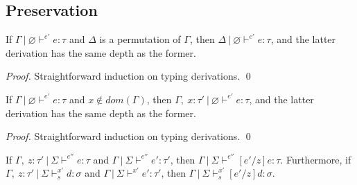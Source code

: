 \documentclass{llncs}
\begin{document}
\subsection{Preservation}

\begin{lemma}[Permutation]
If $\Gamma~|~\varnothing \vdash^{e'} e : \tau$ and $\Delta$ is a permutation of $\Gamma$, then $\Delta~|~\varnothing \vdash^{e'} e : \tau$, and the latter derivation has the same depth as the former.
\end{lemma}

\begin{proof}
Straightforward induction on typing derivations. \qed
\end{proof}

\vspace{6pt}

\begin{lemma}[Weakening]
If $\Gamma~|~\varnothing \vdash^{e'} e : \tau$ and $x \not\in dom(\Gamma)$, then $\Gamma,~x : \tau'~|~\varnothing \vdash^{e'} e : \tau$, and the latter derivation has the same depth as the former.
\end{lemma}

\begin{proof}
Straightforward induction on typing derivations. \qed
\end{proof}

\vspace{6pt}

\begin{lemma}
If $\Gamma,~z : \tau'~|~\Sigma \vdash^{e''} e : \tau$ and $\Gamma~|~\Sigma \vdash^{e''} e' : \tau'$, then $\Gamma~|~\Sigma \vdash^{e''} [e'/z]e : \tau$. Furthermore, if $\Gamma,~z : \tau'~|~\Sigma \vdash^{x'}_s d : \sigma$ and $\Gamma~|~\Sigma \vdash^{x'} e' : \tau'$, then $\Gamma~|~\Sigma \vdash^{x'}_s [e'/z]d : \sigma$.
\end{lemma}
\end{document}
